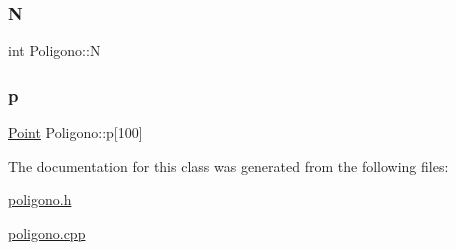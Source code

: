 \subsubsection{\texorpdfstring{N}{N}}
{\footnotesize\ttfamily int Poligono\+::N\hspace{0.3cm}{\ttfamily [protected]}}

\mbox{\label{class_poligono_a5912ffab7b68ee4ac18660b9ea00b5ed}} 
\subsubsection{\texorpdfstring{p}{p}}
{\footnotesize\ttfamily \mbox{\hyperlink{class_point}{Point}} Poligono\+::p\mbox{[}100\mbox{]}\hspace{0.3cm}{\ttfamily [protected]}}



The documentation for this class was generated from the following files\+:\begin{DoxyCompactItemize}
\item 
\mbox{\hyperlink{poligono_8h}{poligono.\+h}}\item 
\mbox{\hyperlink{poligono_8cpp}{poligono.\+cpp}}\end{DoxyCompactItemize}
